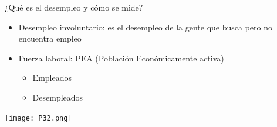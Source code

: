 \documentclass{beamer}
\begin{document}





\begin{frame}{¿Qué es el desempleo y cómo se mide?}

\begin{itemize}
    \item Desempleo involuntario: es el desempleo de la gente que busca pero no encuentra empleo
    \item Fuerza laboral: PEA (Población Económicamente activa)
        \begin{itemize}
            \item Empleados
            \item Desempleados
        \end{itemize}
\end{itemize}

\vspace{3mm}

\centering\texttt{[image: P32.png]}\

\end{frame}

\end{document}
